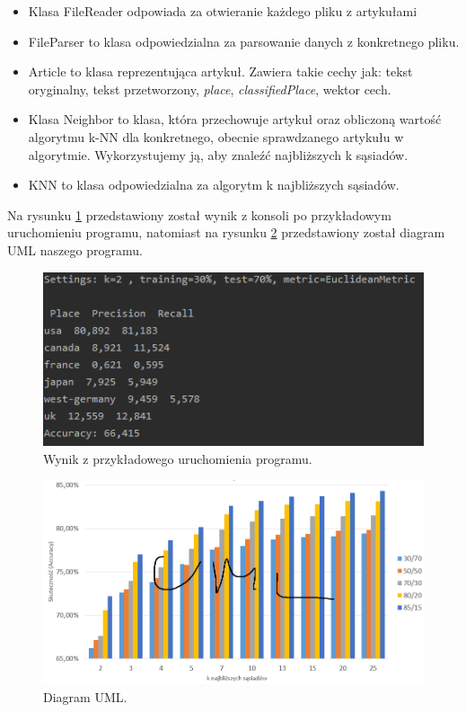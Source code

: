\documentclass{classrep}
\begin{document}
\begin{itemize}
\item Klasa FileReader odpowiada za otwieranie każdego pliku z artykułami
\item FileParser to klasa odpowiedzialna za parsowanie danych z konkretnego pliku.
\item Article to klasa reprezentująca artykuł. Zawiera takie cechy jak: tekst oryginalny, tekst przetworzony, \textsl{place}, \textsl{classifiedPlace}, wektor cech.
\item Klasa Neighbor to klasa, która przechowuje artykuł oraz obliczoną wartość algorytmu k-NN dla konkretnego, obecnie sprawdzanego artykułu w algorytmie. Wykorzystujemy ją, aby znaleźć najbliższych k sąsiadów.
\item KNN to klasa odpowiedzialna za algorytm k najbliższych sąsiadów. 
\end{itemize}
Na rysunku \ref{exampleRun} przedstawiony został wynik z konsoli po przykładowym uruchomieniu programu, natomiast na rysunku \ref{uml} przedstawiony został diagram UML naszego programu. 

\begin{figure}[h!]
	\centering
	\includegraphics[width=1\textwidth]{exampleRun.png}
	\caption{Wynik z przykładowego uruchomienia programu.}
	\label{exampleRun}
\end{figure}

\newpage
\begin{figure}[h!]
	\centering
	\includegraphics[width=1\textwidth]{uml.png}
	\caption{Diagram UML.}
	\label{uml}
\end{figure}
\end{document}
